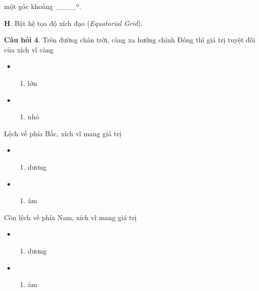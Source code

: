 \documentclass[
  a4paper,
]{book}
\providecommand{\tightlist}{%
  \setlength{\itemsep}{0pt}\setlength{\parskip}{0pt}}
\begin{document}
một góc khoảng \_\_\_\_º.

\textbf{H}. Bật hệ tọa độ xích đạo (\emph{Equatorial Grid}).

\textbf{Câu hỏi 4}. Trên đường chân trời, càng xa hướng chính Đông thì giá trị tuyệt đối của xích vĩ càng

\begin{itemize}
\tightlist
\item
  \begin{enumerate}
  \def\labelenumi{(\Alph{enumi})}
  \tightlist
  \item
    lớn\\
  \end{enumerate}
\item
  \begin{enumerate}
  \def\labelenumi{(\Alph{enumi})}
  \setcounter{enumi}{1}
  \tightlist
  \item
    nhỏ
  \end{enumerate}
\end{itemize}

Lệch về phía Bắc, xích vĩ mang giá trị

\begin{itemize}
\tightlist
\item
  \begin{enumerate}
  \def\labelenumi{(\Alph{enumi})}
  \tightlist
  \item
    dương\\
  \end{enumerate}
\item
  \begin{enumerate}
  \def\labelenumi{(\Alph{enumi})}
  \setcounter{enumi}{1}
  \tightlist
  \item
    âm
  \end{enumerate}
\end{itemize}

Còn lệch về phía Nam, xích vĩ mang giá trị

\begin{itemize}
\tightlist
\item
  \begin{enumerate}
  \def\labelenumi{(\Alph{enumi})}
  \tightlist
  \item
    dương\\
  \end{enumerate}
\item
  \begin{enumerate}
  \def\labelenumi{(\Alph{enumi})}
  \setcounter{enumi}{1}
  \tightlist
  \item
    âm
  \end{enumerate}
\end{itemize}
\end{document}

